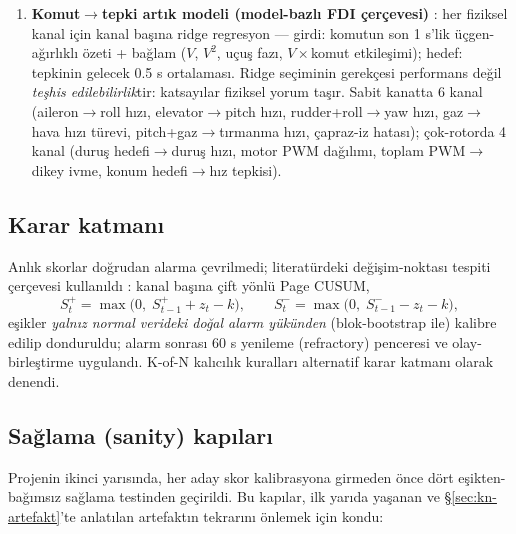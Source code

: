 \documentclass[11pt,a4paper]{article}
\begin{document}
\begin{enumerate}[itemsep=3pt]
\[        \tfrac{1}{2}\Big(\tfrac{z_{c,t}-\mu_{c,t}}{\sigma_{c,t}}\Big)^{2},
        \qquad
        S_{c,t} = \frac{|z_{c,t}-\mu_{c,t}|}{\sigma_{c,t}} .
        \]
        Skor $S$, kanal/faz/kadans koşullu conformal $p$-değerine
        \cite{vovk2005conformal} çevrilecek şekilde tasarlandı. Tepki
        değişkeninin kendi kısa geçmişi girdiye \emph{bilinçli olarak}
        verilmedi (otoregresif kopyacılık tuzağına karşı, \S\ref{sec:kn-artefakt}).
  \item \textbf{Komut$\to$tepki artık modeli (model-bazlı FDI çerçevesi)}
        \cite{willsky1976survey,isermann2006fdi}: her fiziksel kanal için kanal
        başına ridge regresyon --- girdi: komutun son 1 s'lik üçgen-ağırlıklı
        özeti + bağlam ($V$, $V^2$, uçuş fazı, $V\times$komut etkileşimi);
        hedef: tepkinin gelecek 0.5 s ortalaması. Ridge seçiminin gerekçesi
        performans değil \emph{teşhis edilebilirlik}tir: katsayılar fiziksel
        yorum taşır. Sabit kanatta 6 kanal (aileron$\to$roll hızı,
        elevator$\to$pitch hızı, rudder+roll$\to$yaw hızı,
        gaz$\to$hava hızı türevi, pitch+gaz$\to$tırmanma hızı, çapraz-iz hatası);
        çok-rotorda 4 kanal (duruş hedefi$\to$duruş hızı, motor PWM dağılımı,
        toplam PWM$\to$dikey ivme, konum hedefi$\to$hız tepkisi).
\end{enumerate}

\subsection{Karar katmanı}

Anlık skorlar doğrudan alarma çevrilmedi; literatürdeki değişim-noktası tespiti
çerçevesi kullanıldı \cite{page1954cusum,basseville1993detection}: kanal başına
çift yönlü Page CUSUM,
\[
S^{+}_{t} = \max\big(0,\; S^{+}_{t-1} + z_t - k\big), \qquad
S^{-}_{t} = \max\big(0,\; S^{-}_{t-1} - z_t - k\big),
\]
eşikler \emph{yalnız normal verideki doğal alarm yükünden} (blok-bootstrap ile)
kalibre edilip donduruldu; alarm sonrası 60 s yenileme (refractory) penceresi ve
olay-birleştirme uygulandı. K-of-N kalıcılık kuralları alternatif karar katmanı
olarak denendi.

\subsection{Sağlama (sanity) kapıları}
\label{sec:sanity}

Projenin ikinci yarısında, her aday skor kalibrasyona girmeden önce dört
eşikten-bağımsız sağlama testinden geçirildi. Bu kapılar, ilk yarıda yaşanan ve
\S\ref{sec:kn-artefakt}'te anlatılan artefaktın tekrarını önlemek için kondu:
\end{document}
